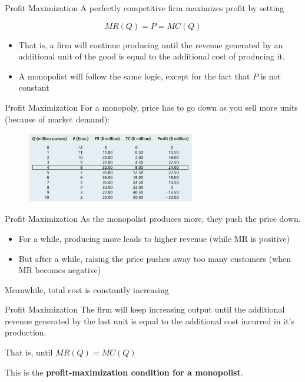 \documentclass[11pt,t]{beamer}
\begin{document}
\begin{frame}{Profit Maximization}
  A perfectly competitive firm maximizes profit by setting 
  
  $$
    MR(Q) = P = MC(Q)
  $$

  \begin{itemize}
    \item That is, a firm will continue producing until the revenue generated by an additional unit of the good is equal to the additional cost of producing it.
    \pause 
    \item A monopolist will follow the same logic, except for the fact that $P$ is not constant
  \end{itemize}
\end{frame}

\begin{frame}{Profit Maximization}
  For a monopoly, price has to go down as you sell more units (because of market demand):

  \begin{figure}
    \includegraphics[width=280px]{figures/table11_1.jpg}
  \end{figure}
\end{frame}

\begin{frame}{Profit Maximization}
  As the monopolist produces more, they push the price down.

  \begin{itemize}
    \item For a while, producing more leads to higher revenue (while MR is positive)
    
    \item But after a while, raising the price pushes away too many customers (when MR becomes negative)
  \end{itemize}

  \bigskip
  Meanwhile, total cost is constantly increasing
\end{frame}

\begin{frame}{Profit Maximization}
  The firm will keep increasing output until the additional revenue generated by the last unit is equal to the additional cost incurred in it's production.

  \bigskip
  That is, until $MR(Q) = MC(Q)$

  \bigskip\pause
  This is the \textbf{profit-maximization condition for a monopolist}.
\end{frame}
\end{document}
